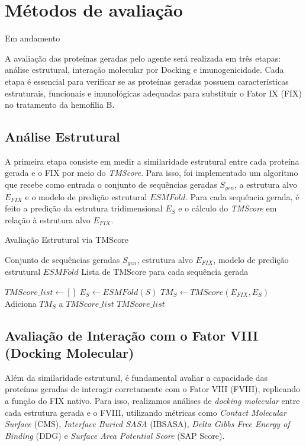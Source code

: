 \section{Métodos de avaliação}
{\color{red} Em andamento}

A avaliação das proteínas geradas pelo agente será realizada em três etapas: 
análise estrutural, interação molecular por Docking e imunogenicidade. 
Cada etapa é essencial para verificar se as proteínas geradas possuem características estruturais, 
funcionais e imunológicas adequadas para substituir o Fator IX (FIX) no tratamento da hemofilia B.  

\subsection{Análise Estrutural}

A primeira etapa consiste em medir a similaridade estrutural entre cada proteína gerada
e o FIX por meio do \textit{TMScore}. 
Para isso, foi implementado um algoritmo que recebe como entrada o conjunto de sequências geradas $S_{gen}$,
a estrutura alvo $E_{FIX}$ e o modelo de predição estrutural $ESMFold$. 
Para cada sequência gerada, é feito a predição da estrutura tridimensional $E_S$ e o cálculo do \textit{TMScore} em
relação à estrutura alvo $E_{FIX}$.

\begin{algorithm}
  \caption{Avaliação Estrutural via TMScore}
  \label{alg:evaluation_tmscore}
  \begin{algorithmic}[1]
  \Require Conjunto de sequências geradas $S_{gen}$, 
  \State         estrutura alvo $E_{FIX}$,
  \State         modelo de predição estrutural $ESMFold$
  \Ensure Lista de TMScore para cada sequência gerada

  \State $TMScore\_list \gets []$
      \State $E_S \gets ESMFold(S)$
      \State $TM_S \gets TMScore(E_{FIX}, E_S)$
      \State Adiciona $TM_S$ a $TMScore\_list$
  \EndFor
  \State \Return $TMScore\_list$
  \end{algorithmic}
\end{algorithm}

\subsection{Avaliação de Interação com o Fator VIII (Docking Molecular)}

Além da similaridade estrutural, é fundamental avaliar a capacidade das proteínas geradas 
de interagir corretamente com o Fator VIII (FVIII), replicando a função do FIX nativo. 
Para isso, realizamos análises de \textit{docking molecular} entre cada estrutura gerada e o FVIII,
utilizando métricas como \textit{Contact Molecular Surface} (CMS), \textit{Interface Buried SASA} (IBSASA), 
\textit{Delta Gibbs Free Energy of Binding} (DDG) e \textit{Surface Area Potential Score} (SAP Score).

